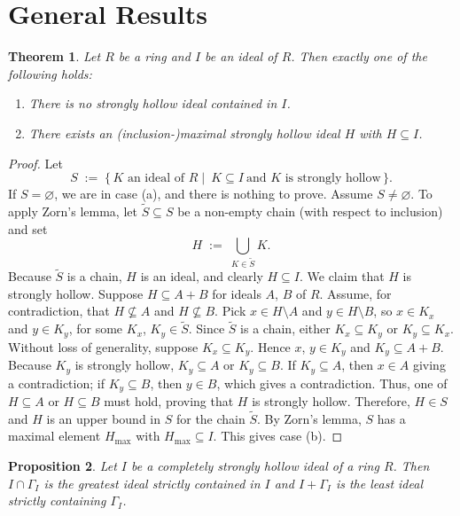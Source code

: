 \documentclass[11pt,english]{amsart}
\newtheorem{theorem}{Theorem}[section]
\newtheorem{proposition}[theorem]{Proposition}
\theoremstyle{definition}
\numberwithin{equation}{section}
\theoremstyle{remark}
\begin{document}
\smallskip
\section{General Results}
\label{GR}

\begin{theorem}\label{max_sh}
Let $R$ be a ring and $I$ be an ideal of $R$. Then exactly one of the following holds:
\begin{enumerate}
\item[\textup{(a)}] There is no strongly hollow ideal contained in $I$.
\item[\textup{(b)}] There exists an (inclusion-)maximal strongly hollow ideal $H$ with $H\subseteq I$.
\end{enumerate}
\end{theorem}

\begin{proof}
Let
\[
S\;:=\;\{\,K \text{ an ideal of } R\mid\ K\subseteq I\ \text{and }K\text{ is strongly hollow}\,\}.
\]
If $S=\varnothing$, we are in case \textup{(a)}, and there is nothing to prove.
Assume $S\neq\varnothing$. To apply Zorn's lemma, let $\widetilde S\subseteq S$ be a non-empty chain
(with respect to inclusion) and set
\[
H\;:=\;\bigcup_{K\in\widetilde S} K.
\]
Because $\widetilde S$ is a chain, $H$ is an ideal, and clearly $H\subseteq I$.
We claim that $H$ is strongly hollow. Suppose $H\subseteq A+B$ for ideals $A$, $B$ of $R$.
Assume, for contradiction, that $H\nsubseteq A$ and $H\nsubseteq B$.
Pick $x\in H\setminus A$ and $y\in H\setminus B$, so $x\in K_x$ and $y\in K_y$, for some $K_x$, $K_y\in\widetilde S$.
Since $\widetilde S$ is a chain, either $K_x\subseteq K_y$ or $K_y\subseteq K_x$.
Without loss of generality, suppose $K_x\subseteq K_y$. Hence $x$, $y\in K_y$ and $K_y\subseteq A+B$.
Because $K_y$ is strongly hollow, $K_y\subseteq A$ or $K_y\subseteq B$.
If $K_y\subseteq A$, then $x\in A$ giving a contradiction; if $K_y\subseteq B$, then $y\in B$, which gives a contradiction.
Thus, one of $H\subseteq A$ or $H\subseteq B$ must hold, proving that $H$ is strongly hollow.
Therefore, $H\in S$ and $H$ is an upper bound in $S$ for the chain $\widetilde S$.
By Zorn's lemma, $S$ has a maximal element $H_{\max}$ with $H_{\max}\subseteq I$.
This gives case \textup{(b)}.
\end{proof}

\begin{proposition}
    Let $I$ be a completely strongly hollow ideal of a ring $R$. Then $I\cap \Gamma_I$ is the greatest ideal strictly contained in $I$ and $I+\Gamma_I$ is the least ideal strictly containing $\Gamma_I$. 
\end{proposition}
\end{document}
